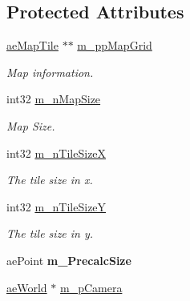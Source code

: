 \subsection*{Protected Attributes}
\begin{DoxyCompactItemize}
\item 
\hyperlink{classae_tiled_map_1_1ae_map_tile}{ae\+Map\+Tile} $\ast$$\ast$ \hyperlink{classae_tiled_map_aacd425ffb4f463b3617337355aab2aba}{m\+\_\+pp\+Map\+Grid}\hypertarget{classae_tiled_map_aacd425ffb4f463b3617337355aab2aba}{}\label{classae_tiled_map_aacd425ffb4f463b3617337355aab2aba}

\begin{DoxyCompactList}\small\item\em Map information. \end{DoxyCompactList}\item 
int32 \hyperlink{classae_tiled_map_a5b729d615199651de4a16b80bca21581}{m\+\_\+n\+Map\+Size}\hypertarget{classae_tiled_map_a5b729d615199651de4a16b80bca21581}{}\label{classae_tiled_map_a5b729d615199651de4a16b80bca21581}

\begin{DoxyCompactList}\small\item\em Map Size. \end{DoxyCompactList}\item 
int32 \hyperlink{classae_tiled_map_a7b63c3c1824027d372e9b5b626e68163}{m\+\_\+n\+Tile\+SizeX}\hypertarget{classae_tiled_map_a7b63c3c1824027d372e9b5b626e68163}{}\label{classae_tiled_map_a7b63c3c1824027d372e9b5b626e68163}

\begin{DoxyCompactList}\small\item\em The tile size in x. \end{DoxyCompactList}\item 
int32 \hyperlink{classae_tiled_map_a419ddab268eb19a325969277aa152471}{m\+\_\+n\+Tile\+SizeY}\hypertarget{classae_tiled_map_a419ddab268eb19a325969277aa152471}{}\label{classae_tiled_map_a419ddab268eb19a325969277aa152471}

\begin{DoxyCompactList}\small\item\em The tile size in y. \end{DoxyCompactList}\item 
ae\+Point {\bfseries m\+\_\+\+Precalc\+Size}\hypertarget{classae_tiled_map_aa486053be2f9ac90fe3ddd819c93361a}{}\label{classae_tiled_map_aa486053be2f9ac90fe3ddd819c93361a}

\item 
\hyperlink{classae_world}{ae\+World} $\ast$ \hyperlink{classae_tiled_map_a5ca0d7e7e07f9af20a03844b2838fd9d}{m\+\_\+p\+Camera}\hypertarget{classae_tiled_map_a5ca0d7e7e07f9af20a03844b2838fd9d}{}\label{classae_tiled_map_a5ca0d7e7e07f9af20a03844b2838fd9d}


\end{DoxyCompactItemize}
